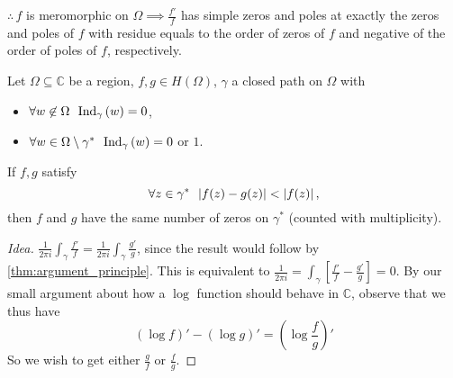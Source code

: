 \documentclass[11pt, oneside]{book}
\begin{document}
$\therefore \, f$ is meromorphic on $\Omega \implies \frac{f'}{f}$ has simple zeros and poles at exactly the zeros and poles of $f$ with residue equals to the order of zeros of $f$ and negative of the order of poles of $f$, respectively.

\begin{thm}\label{thm:rouche_s_theorem}
  Let $\Omega \subseteq \mathbb{C}$ be a region, $f, g \in H(\Omega)$, $\gamma$ a closed path on $\Omega$ with
  \begin{itemize}
    \item $\forall w \not\in \Omega \enspace \operatorname{Ind}_{\gamma}\left( w \right) = 0$,
    \item $\forall w \in \Omega \setminus \gamma^* \enspace \operatorname{Ind}_{\gamma}\left( w \right) = 0$ or $1$.
  \end{itemize}
  If $f, g$ satisfy
  \begin{equation*}
    \forall z \in \gamma^* \enspace \left|f(z) - g(z)\right| < \left|f(z)\right|,
  \end{equation*}
  then $f$ and $g$ have the same number of zeros on $\gamma^*$ (counted with multiplicity).
\end{thm}

\begin{proof}[Idea]
   $\frac{1}{2 \pi i} \int_{\gamma} \frac{f'}{f} = \frac{1}{2 \pi i} \int_{\gamma} \frac{g'}{g}$, since the result would follow by \cref{thm:argument_principle}. This is equivalent to $\frac{1}{2 \pi i} = \int_{\gamma} \left[ \frac{f'}{f} - \frac{g'}{g} \right] = 0$. By our small argument about how a $\log$ function should behave in $\mathbb{C}$, observe that we thus have
  \begin{equation*}
    \left( \log f \right)' - \left( \log g \right)' = \left( \log \frac{f}{g} \right)'
  \end{equation*}
  So we wish to get either $\frac{g}{f}$ or $\frac{f}{g}$.
\end{proof}
\end{document}

